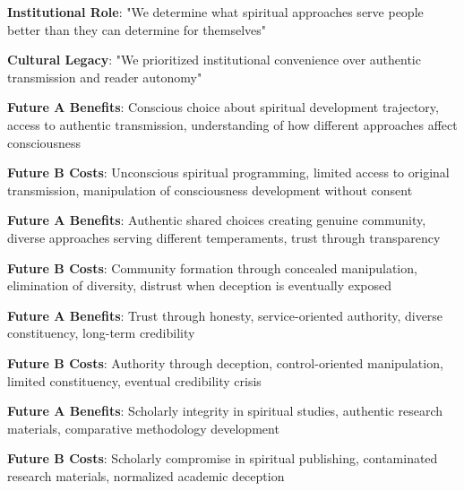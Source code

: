\documentclass[12pt,twoside]{book}
\begin{document}
\textbf{\textbf{Institutional Role}}: "We determine what spiritual approaches serve people better than they can determine for themselves"

\textbf{\textbf{Cultural Legacy}}: "We prioritized institutional convenience over authentic transmission and reader autonomy"

\textbf{\textbf{Future A Benefits}}: Conscious choice about spiritual development trajectory, access to authentic transmission, understanding of how different approaches affect consciousness

\textbf{\textbf{Future B Costs}}: Unconscious spiritual programming, limited access to original transmission, manipulation of consciousness development without consent

\textbf{\textbf{Future A Benefits}}: Authentic shared choices creating genuine community, diverse approaches serving different temperaments, trust through transparency

\textbf{\textbf{Future B Costs}}: Community formation through concealed manipulation, elimination of diversity, distrust when deception is eventually exposed

\textbf{\textbf{Future A Benefits}}: Trust through honesty, service-oriented authority, diverse constituency, long-term credibility

\textbf{\textbf{Future B Costs}}: Authority through deception, control-oriented manipulation, limited constituency, eventual credibility crisis

\textbf{\textbf{Future A Benefits}}: Scholarly integrity in spiritual studies, authentic research materials, comparative methodology development

\textbf{\textbf{Future B Costs}}: Scholarly compromise in spiritual publishing, contaminated research materials, normalized academic deception
\end{document}
